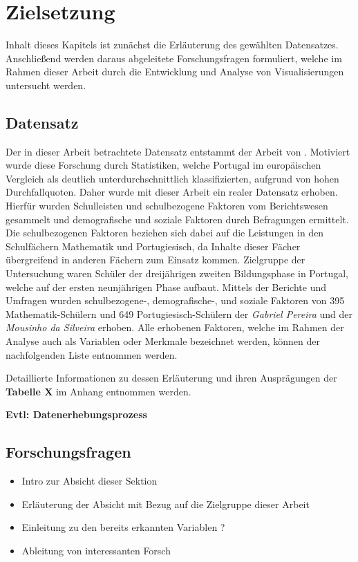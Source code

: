 \chapter[Zielsetzung]{Zielsetzung}

Inhalt dieses Kapitels ist zunächst die Erläuterung des gewählten Datensatzes.
Anschließend werden daraus abgeleitete Forschungsfragen formuliert, welche im Rahmen dieser Arbeit durch die Entwicklung und Analyse von Visualisierungen untersucht werden. 

\section[Untersuchter Datensatz]{Datensatz}

Der in dieser Arbeit betrachtete Datensatz entstammt der Arbeit von \cite[]{Cortez2008UsingDM}.
Motiviert wurde diese Forschung durch Statistiken, welche Portugal im europäischen Vergleich als deutlich unterdurchschnittlich klassifizierten, aufgrund von hohen Durchfallquoten. \cite[S. 1]{Cortez2008UsingDM}
Daher wurde mit dieser Arbeit ein realer Datensatz erhoben.
Hierfür wurden Schulleisten und schulbezogene Faktoren vom Berichtswesen gesammelt und demografische und soziale Faktoren durch Befragungen ermittelt. \cite[S. 1]{Cortez2008UsingDM}
Die schulbezogenen Faktoren beziehen sich dabei auf die Leistungen in den Schulfächern Mathematik und Portugiesisch, da Inhalte dieser Fächer übergreifend in anderen Fächern zum Einsatz kommen. \cite[S. 2]{Cortez2008UsingDM}
Zielgruppe der Untersuchung waren Schüler der dreijährigen zweiten Bildungsphase in Portugal, welche auf der ersten neunjährigen Phase aufbaut. \cite[S. 2]{Cortez2008UsingDM}
Mittels der Berichte und Umfragen wurden schulbezogene-, demografische-, und soziale Faktoren von 395 Mathematik-Schülern und 649 Portugiesisch-Schülern der \textit{Gabriel Pereira} und der \textit{Mousinho da Silveira} erhoben.
Alle erhobenen Faktoren, welche im Rahmen der Analyse auch als Variablen oder Merkmale bezeichnet werden, können der nachfolgenden Liste entnommen werden. 



Detaillierte Informationen zu dessen Erläuterung und ihren Ausprägungen der \textbf{Tabelle X} im Anhang entnommen werden.

\textbf{Evtl: Datenerhebungsprozess}

\section[Forschungsfragen]{Forschungsfragen}

\begin{itemize}
    \item Intro zur Absicht dieser Sektion
    \item Erläuterung der Absicht mit Bezug auf die Zielgruppe dieser Arbeit
    \item Einleitung zu den bereits erkannten Variablen ?
    \item Ableitung von interessanten Forsch
\end{itemize}